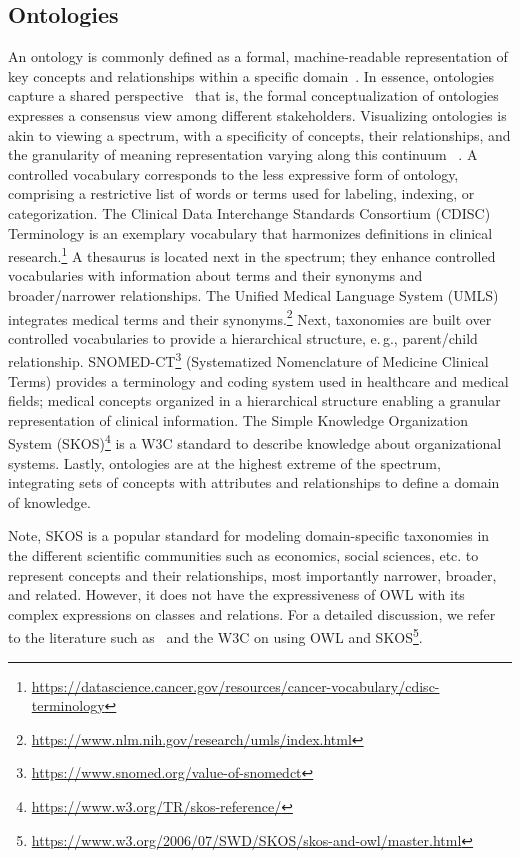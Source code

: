 \documentclass[a4paper,USenglish]{tgdk-v2021}
\newcommand{\myurl}[1]{\footnote{\url{#1}}}
\begin{document}
\subsection{Ontologies}
\label{sec:ontologies:definition}

An ontology is commonly defined as a formal, machine-readable representation of key concepts and relationships within a specific domain~\cite{GuarinoOberleStaabWhatIsAnOntology2009,OberleMiddleware2006}.
In essence, ontologies capture a shared perspective~\cite{GuarinoOberleStaabWhatIsAnOntology2009} that is, the formal conceptualization of ontologies expresses a consensus view among different stakeholders. 
Visualizing ontologies is akin to viewing a spectrum, with a specificity of concepts, their relationships, and the granularity of meaning representation varying along this continuum
~\cite{DBLP:conf/dagstuhl/McGuinness03,DBLP:journals/sigmod/UscholdG04,DBLP:journals/ao/Uschold15}.
A controlled vocabulary corresponds to the less expressive form of ontology, comprising a restrictive list of words or terms used for labeling, indexing, or categorization. The Clinical Data Interchange Standards Consortium (CDISC) Terminology is an exemplary vocabulary that harmonizes definitions in clinical research.\myurl{https://datascience.cancer.gov/resources/cancer-vocabulary/cdisc-terminology} 
A thesaurus is located next in the spectrum; they enhance controlled vocabularies with information about terms and their synonyms and broader/narrower relationships. The Unified Medical Language System (UMLS) integrates medical terms and their synonyms.\myurl{https://www.nlm.nih.gov/research/umls/index.html}
Next, taxonomies are built over controlled vocabularies to provide a hierarchical structure, e.\,g., parent/child relationship. 
SNOMED-CT\myurl{https://www.snomed.org/value-of-snomedct} (Systematized Nomenclature of Medicine Clinical Terms) provides a terminology and coding system used in healthcare and medical fields; medical concepts organized in a hierarchical structure enabling a granular representation of clinical information. 
The Simple Knowledge Organization System (SKOS)\myurl{https://www.w3.org/TR/skos-reference/} is a W3C standard to describe knowledge about organizational systems. 
Lastly, ontologies are at the highest extreme of the spectrum, integrating sets of concepts with attributes and relationships to define a domain of knowledge.

Note, SKOS is a popular standard for modeling domain-specific taxonomies in the different scientific communities such as economics, social sciences, etc. to represent concepts and their relationships, most importantly narrower, broader, and related. However, it does not have the expressiveness of OWL with its complex expressions on classes and relations. For a detailed discussion, we refer to the literature such as~\cite{DBLP:conf/owled/JuppBS08} and the W3C on using OWL and SKOS\myurl{https://www.w3.org/2006/07/SWD/SKOS/skos-and-owl/master.html}.
\end{document}
